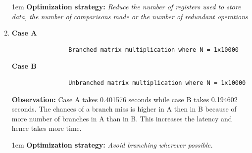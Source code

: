 \documentclass[12,a4paper]{article}
\begin{document}
\begin{enumerate}
        \parskip 1em
        \textbf{Optimization strategy:} \emph{Reduce the number of registers used to store data, the number of comparisons made or the number of redundant operations}
        \item \textbf{Case A}
            \begin{lstlisting}
                Branched matrix multiplication where N = 1x10000
            \end{lstlisting}
            \textbf{Case B}
            \begin{lstlisting}
                Unbranched matrix multiplication where N = 1x10000
            \end{lstlisting}
        \textbf{Observation:} Case A takes 0.401576 seconds while case B takes 0.194602 seconds. The chances of a branch miss is higher in A then in B because of more number of branches in A than in B. This increases the latency and hence takes more time.
        
        \parskip 1em
        \textbf{Optimization strategy:} \emph{Avoid branching wherever possible.}
    \end{enumerate}
\end{document}

